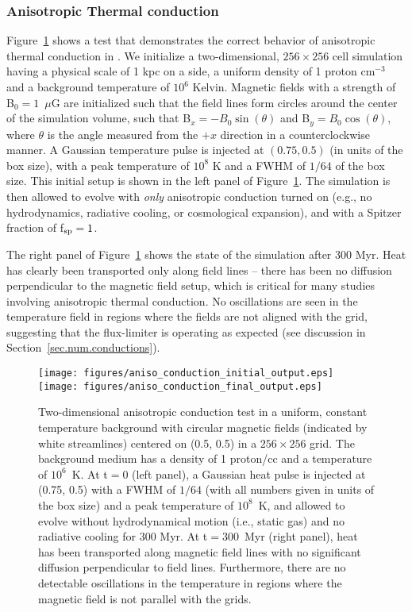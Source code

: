 \subsubsection{Anisotropic Thermal conduction}
\label{sec.tests.conduct}

Figure~\ref{fig.conduct} shows a test that demonstrates the correct
behavior of anisotropic thermal conduction in \enzo. We initialize a
two-dimensional, $256 \times 256$ cell simulation having a physical
scale of 1 kpc on a side, a uniform density of 1 proton cm$^{-3}$ and
a background temperature of $10^6$ Kelvin.  Magnetic fields with a
strength of B$_0 = 1$~$\mu$G are initialized such that the field lines
form circles around the center of the simulation volume, such that
B$_x = -B_0\sin(\theta)$ and B$_y = B_0\cos(\theta)$, where $\theta$
is the angle measured from the $+x$ direction in a counterclockwise
manner.  A Gaussian temperature pulse is injected at $(0.75, 0.5)$ (in
units of the box size), with a peak temperature of $10^8$ K and a FWHM
of $1/64$ of the box size.  This initial setup is shown in the left
panel of Figure~\ref{fig.conduct}.  The simulation is then allowed to
evolve with \textit{only} anisotropic conduction turned on (e.g., no
hydrodynamics, radiative cooling, or cosmological expansion), and with
a Spitzer fraction of f$_{\rm sp} = 1$.

The right panel of Figure~\ref{fig.conduct} shows the state of the
simulation after 300 Myr.  Heat has clearly been transported only
along field lines -- there has been no diffusion perpendicular to the
magnetic field setup, which is critical for many studies involving
anisotropic thermal conduction.  No oscillations are seen in the
temperature field in regions where the fields are not aligned with the
grid, suggesting that the flux-limiter is operating as expected (see
discussion in Section~\ref{sec.num.conductions}).

\begin{figure}
\begin{center}
\texttt{[image: figures/aniso\_conduction\_initial\_output.eps]}
\texttt{[image: figures/aniso\_conduction\_final\_output.eps]}
\caption{Two-dimensional anisotropic conduction test in a uniform,
constant temperature background with circular magnetic fields
(indicated by white streamlines) centered on (0.5, 0.5) in a $256
\times 256$ grid. The background medium has a density of 1 proton/cc
and a temperature of $10^6$~K.  At t$ = 0$ (left panel), a Gaussian
heat pulse is injected at (0.75, 0.5) with a FWHM of $1/64$ (with all
numbers given in units of the box size) and a peak temperature of
$10^8$~K, and allowed to evolve without hydrodynamical motion (i.e.,
static gas) and no radiative cooling for 300 Myr.  At t$ = 300$~Myr
(right panel), heat has been transported along magnetic field lines
with no significant diffusion perpendicular to field
lines. Furthermore, there are no detectable oscillations in the
temperature in regions where the magnetic field is not parallel with
the grids.}
\label{fig.conduct}
\end{center}
\end{figure}
